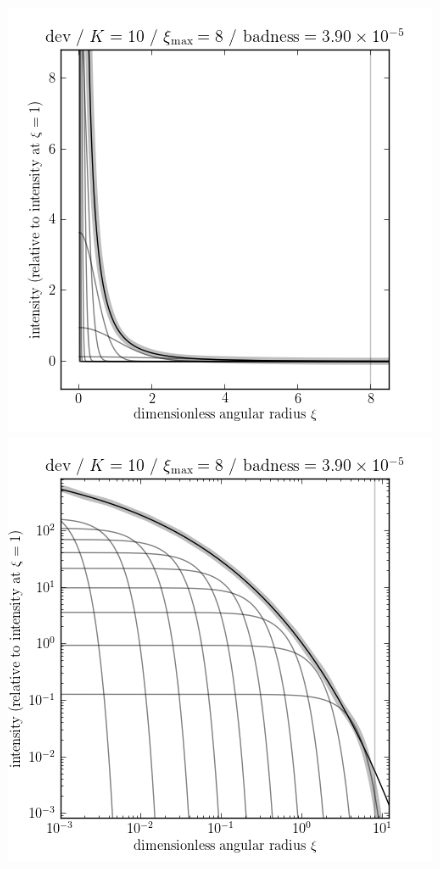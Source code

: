 \documentclass[12pt,pdftex,preprint]{aastex}
\newlength{\figurewidth}
\begin{document}
\clearpage
\begin{figure}
\includegraphics[width=\figurewidth]{dev_K10_MR08_profile.png}%
\includegraphics[width=\figurewidth]{dev_K10_MR08_profile_log.png}\\

\end{figure}
\end{document}
